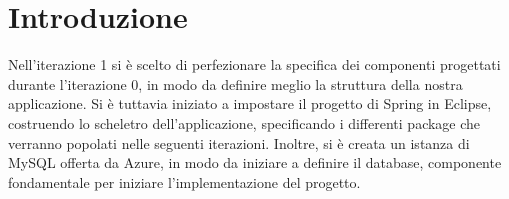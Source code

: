 \section{Introduzione}
Nell'iterazione 1 si è scelto di perfezionare la specifica dei componenti progettati durante l'iterazione 0, in modo da definire meglio la struttura della nostra applicazione. Si è tuttavia iniziato a impostare il progetto di Spring in Eclipse, costruendo lo scheletro dell'applicazione, specificando i differenti package che verranno popolati nelle seguenti iterazioni. Inoltre, si è creata un istanza di MySQL offerta da Azure, in modo da iniziare a definire il database, componente fondamentale per iniziare l'implementazione del progetto.